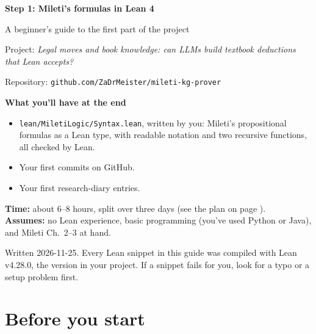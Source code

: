 \documentclass[11pt,a4paper]{article}
\newcommand{\code}[1]{\texttt{#1}}
\begin{document}
\begin{titlepage}
\vspace*{3cm}
{\sffamily\color{accent}\Huge\bfseries Step 1: Mileti's formulas in Lean 4\par}
\vspace{0.6cm}
{\sffamily\Large A beginner's guide to the first part of the project\par}
\vspace{1.2cm}
{\large Project: \emph{Legal moves and book knowledge: can LLMs build textbook deductions that Lean accepts?}\par}
\vspace{0.4cm}
{\large Repository: \code{github.com/ZaDrMeister/mileti-kg-prover}\par}
\vspace{2cm}
\begin{tcolorbox}[colback=accent!4,colframe=accent,boxrule=0.6pt,arc=2pt]
\textbf{What you'll have at the end}
\begin{itemize}
\item \code{lean/MiletiLogic/Syntax.lean}, written by you: Mileti's propositional formulas as a Lean type, with readable notation and two recursive functions, all checked by Lean.
\item Your first commits on GitHub.
\item Your first research-diary entries.
\end{itemize}
\textbf{Time:} about 6--8 hours, split over three days (see the plan on page \pageref{plan}).\\[4pt]
\textbf{Assumes:} no Lean experience, basic programming (you've used Python or Java), and Mileti Ch.~2--3 at hand.
\end{tcolorbox}
\vfill
{\small Written 2026-11-25. Every Lean snippet in this guide was compiled with Lean v4.28.0, the version in your project. If a snippet fails for you, look for a typo or a setup problem first.\par}
\end{titlepage}

\tableofcontents
\newpage

\section{Before you start}
\end{document}
